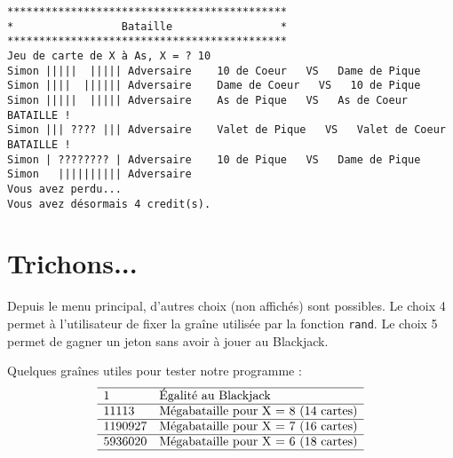 \documentclass[a4paper]{article}
\begin{document}
\begin{verbatim}
********************************************
*                 Bataille                 *
********************************************
Jeu de carte de X à As, X = ? 10
Simon |||||  ||||| Adversaire    10 de Coeur   VS   Dame de Pique
Simon ||||  |||||| Adversaire    Dame de Coeur   VS   10 de Pique
Simon |||||  ||||| Adversaire    As de Pique   VS   As de Coeur  BATAILLE !
Simon ||| ???? ||| Adversaire    Valet de Pique   VS   Valet de Coeur  BATAILLE !
Simon | ???????? | Adversaire    10 de Pique   VS   Dame de Pique
Simon   |||||||||| Adversaire 
Vous avez perdu...
Vous avez désormais 4 credit(s).
\end{verbatim}
  
  \section{Trichons...}
  
  Depuis le menu principal, d'autres choix (non affichés) sont possibles. Le choix 4 permet à l'utilisateur de fixer la graîne utilisée par la fonction \verb|rand|. Le choix 5 permet de gagner un jeton sans avoir à jouer au Blackjack.

  Quelques graînes utiles pour tester notre programme :
  \[\begin{array}{ll}
    \hline
    1 & \text{Égalité au Blackjack}\\
    \hline
    11113 & \text{Mégabataille pour X = 8 (14 cartes)}\\
    \hline
    1190927 & \text{Mégabataille pour X = 7 (16 cartes)}\\
    \hline
    5936020 & \text{Mégabataille pour X = 6 (18 cartes)}\\ 
    \hline
  \end{array}\]
\end{document}
